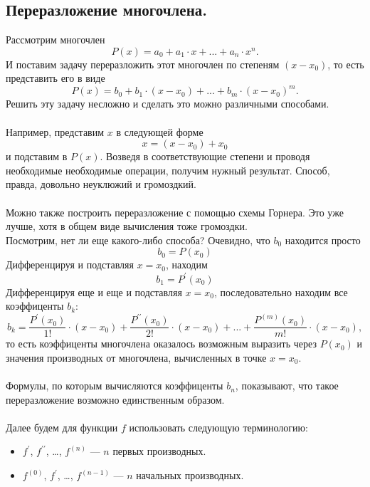 	\subsection{Переразложение многочлена.}
	Рассмотрим многочлен $$P(x) = a_{0} + a_{1}\cdot x + ... + a_{n} \cdot x^n.$$
	И поставим задачу переразложить этот многочлен по степеням $(x-x_{0})$, то есть представить его в виде $$P(x) = b_{0} + b_{1} \cdot (x-x_{0}) + ... + b_{m} \cdot (x-x_{0})^m.$$
	Решить эту задачу несложно и сделать это можно различными способами.\\\\
	Например, представим $x$ в следующей форме $$x = (x-x_{0})+x_{0}$$ и подставим в $P(x)$. Возведя в соответствующие степени и проводя необходимые необходимые операции, получим нужный результат. Способ, правда, довольно неуклюжий и громоздкий.\\\\
	Можно также построить переразложение с помощью схемы Горнера. Это уже лучше, хотя в общем виде вычисления тоже громоздки.\\
	Посмотрим, нет ли еще какого-либо способа? Очевидно, что $b_{0}$ находится просто $$b_{0} = P(x_{0})$$
	Дифференцируя и подставляя $x = x_{0}$, находим $$b_{1} = P^\prime(x_{0})$$
	Дифференцируя еще и еще и подставляя $x = x_{0}$, последовательно находим все коэффиценты $b_{k}$: $$b_{k} = \frac{P^\prime(x_{0})}{1!}\cdot(x-x_{0}) + \frac{P^{\prime\prime}(x_{0})}{2!}\cdot(x-x_{0}) + ... + \frac{P^{(m)}(x_{0})}{m!}\cdot(x-x_{0}),$$ 
	то есть коэффиценты многочлена оказалось возможным выразить через $P(x_{0})$ и значения производных от многочлена, вычисленных в точке $x = x_{0}$.\\\\
	Формулы, по которым вычисляются коэффиценты $b_{n}$, показывают, что такое переразложение возможно единственным образом.\\\\
	Далее будем для функции $f$ использовать следующую терминологию:
	\begin{itemize}
		\item $f^\prime$, $f^{\prime\prime}$, \dots, $f^{(n)}$ --- $n$ первых производных.
		\item $f^{(0)}$, $f^\prime$, \dots, $f^{(n-1)}$ --- $n$ начальных производных.
	\end{itemize}
